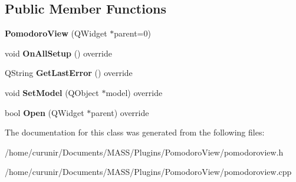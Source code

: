 \subsection*{Public Member Functions}
\begin{DoxyCompactItemize}
\item 
{\bfseries Pomodoro\+View} (Q\+Widget $\ast$parent=0)\hypertarget{class_pomodoro_view_a73074fd29303bf2e933f6e4fcba3e05a}{}\label{class_pomodoro_view_a73074fd29303bf2e933f6e4fcba3e05a}

\item 
void {\bfseries On\+All\+Setup} () override\hypertarget{class_pomodoro_view_af08465f4631ec877442d5fcde56d2f99}{}\label{class_pomodoro_view_af08465f4631ec877442d5fcde56d2f99}

\item 
Q\+String {\bfseries Get\+Last\+Error} () override\hypertarget{class_pomodoro_view_ac18c3f31681087212f58d0c83f9efaa0}{}\label{class_pomodoro_view_ac18c3f31681087212f58d0c83f9efaa0}

\item 
void {\bfseries Set\+Model} (Q\+Object $\ast$model) override\hypertarget{class_pomodoro_view_a77a5481dfcd4a784c9a20f9429641bbf}{}\label{class_pomodoro_view_a77a5481dfcd4a784c9a20f9429641bbf}

\item 
bool {\bfseries Open} (Q\+Widget $\ast$parent) override\hypertarget{class_pomodoro_view_a645600605cbd2577e452a46749c7553f}{}\label{class_pomodoro_view_a645600605cbd2577e452a46749c7553f}

\end{DoxyCompactItemize}


The documentation for this class was generated from the following files\+:\begin{DoxyCompactItemize}
\item 
/home/curunir/\+Documents/\+M\+A\+S\+S/\+Plugins/\+Pomodoro\+View/pomodoroview.\+h\item 
/home/curunir/\+Documents/\+M\+A\+S\+S/\+Plugins/\+Pomodoro\+View/pomodoroview.\+cpp\end{DoxyCompactItemize}
